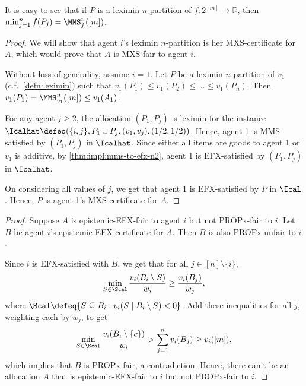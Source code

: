 It is easy to see that if $P$ is a leximin $n$-partition of $f: 2^{[m]} \to \mathbb{R}$,
then $\min_{j=1}^n f(P_j) = \MMS_f^n([m])$.

\begin{proof}
We will show that agent $i$'s leximin $n$-partition is her MXS-certificate for $A$,
which would prove that $A$ is MXS-fair to agent $i$.

Without loss of generality, assume $i = 1$.
Let $P$ be a leximin $n$-partition of $v_1$ (c.f.~\cref{defn:leximin})
such that $v_1(P_1) \le v_1(P_2) \le \ldots \le v_1(P_n)$.
Then $v_1(P_1) = \MMS_{v_1}^n([m]) \le v_1(A_1)$.

For any agent $j \ge 2$, the allocation $(P_1, P_j)$ is leximin for
the instance $\Icalhat \defeq (\{i, j\}, P_1 \cup P_j, (v_1, v_j), (1/2, 1/2))$.
Hence, agent 1 is MMS-satisfied by $(P_1, P_j)$ in $\Icalhat$.
Since either all items are goods to agent 1 or $v_1$ is additive,
by \cref{thm:impl:mms-to-efx-n2}, agent 1 is EFX-satisfied by $(P_1, P_j)$ in $\Icalhat$.

On considering all values of $j$, we get that agent 1 is EFX-satisfied by $P$ in $\Ical$.
Hence, $P$ is agent 1's MXS-certificate for $A$.
\end{proof}

\begin{proof}
Suppose $A$ is epistemic-EFX-fair to agent $i$ but not PROPx-fair to $i$.
Let $B$ be agent $i$'s epistemic-EFX-certificate for $A$.
Then $B$ is also PROPx-unfair to $i$.

Since $i$ is EFX-satisfied with $B$, we get that for all $j \in [n] \setminus \{i\}$,
\[ \min_{S \in \Scal} \frac{v_i(B_i \setminus S)}{w_i} \ge \frac{v_i(B_j)}{w_j}, \]
where $\Scal \defeq \{S \subseteq B_i: v_i(S \mid B_i \setminus S) < 0\}$.
Add these inequalities for all $j$, weighting each by $w_j$, to get
\[ \min_{S \in \Scal} \frac{v_i(B_i \setminus \{c\})}{w_i} > \sum_{j=1}^n v_i(B_j) \ge v_i([m]), \]
which implies that $B$ is PROPx-fair, a contradiction.
Hence, there can't be an allocation $A$ that is epistemic-EFX-fair to $i$
but not PROPx-fair to $i$.
\end{proof}

